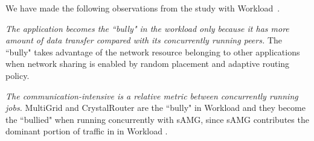 We have made the following observations from the study with Workload~.

\emph{The application becomes the ``bully" in the workload only because it has more amount of data transfer compared with its concurrently running peers.} The ``bully" takes advantage of the network resource belonging to other applications when network sharing is enabled by random placement and adaptive routing policy. 

\emph{The communication-intensive is a relative metric between concurrently running jobs.} MultiGrid and CrystalRouter are the ``bully" in Workload  and they become the ``bullied" when running concurrently with sAMG, since sAMG contributes the dominant portion of traffic in  in Workload .




